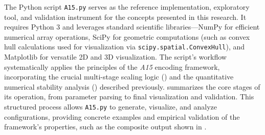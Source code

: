 \documentclass[10pt]{article}
\def\AAAB{\textit{A15}}
\begin{document}
The Python script \texttt{A15.py} \cite{Risinger2024A15} serves as the reference implementation, exploratory tool, and validation instrument for the concepts presented in this research. It requires Python 3 and leverages standard scientific libraries—NumPy \cite{Harris2020} for efficient numerical array operations, SciPy \cite{Virtanen2020} for geometric computations (such as convex hull calculations used for visualization via \texttt{scipy.spatial.ConvexHull}), and Matplotlib \cite{Hunter2007} for versatile 2D and 3D visualization. The script's workflow systematically applies the principles of the \AAAB{} encoding framework, incorporating the crucial multi-stage scaling logic () and the quantitative numerical stability analysis () described previously.  summarizes the core stages of its operation, from parameter parsing to final visualization and validation. This structured process allows \texttt{A15.py} to generate, visualize, and analyze configurations, providing concrete examples and empirical validation of the framework's properties, such as the composite output shown in .
\end{document}
